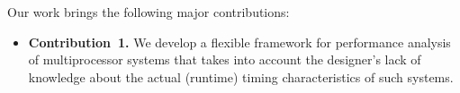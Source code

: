 Our work brings the following major contributions:
\begin{itemize}

\item {\bfseries Contribution~1.} We develop a flexible framework for
  performance analysis of multiprocessor systems that takes into account the
  designer's lack of knowledge about the actual (runtime) timing characteristics
  of such systems.

\end{itemize}
